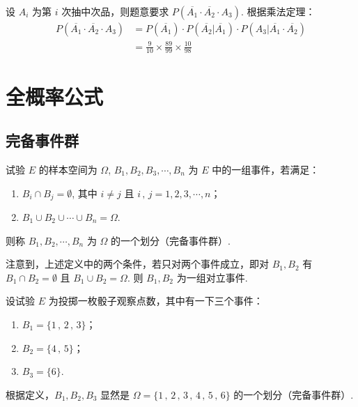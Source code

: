 \documentclass[12pt, a4paper, oneside, UTF8]{ctexbook}
\begin{document}
\begin{solution}
    设 \(A_i\) 为第 \(i\) 次抽中次品，则题意要求 \(P\left(\overline{A_1}\cdot \overline{A_2} \cdot A_3\right)\). 根据乘法定理：
    \begin{align*}
        P\left(\overline{A_1}\cdot \overline{A_2} \cdot A_3\right) &= P\left(\overline{A_1}\right) \cdot P\left(\overline{A_2} | \overline{A_1}\right) \cdot P\left(A_3 | \overline{A_1} \cdot \overline{A_2}\right) \\
        &= \frac{9}{10} \times \frac{89}{99} \times \frac{10}{98}
    \end{align*}
\end{solution}

\clearpage

\section{全概率公式}

\subsection{完备事件群}

\begin{defn}
    试验 \(E\) 的样本空间为 \(\Omega\), \(B_1 , B_2 , B_3 , \cdots , B_n\) 为 \(E\) 中的一组事件，若满足：
    \begin{enumerate}
        \item \(B_i \cap B_j = \emptyset\), 其中 \(i \neq j\) 且 \(i\,,\,j = 1 , 2 , 3 ,\cdots , n\)；
        \item \(B_1 \cup B_2 \cup \cdots \cup B_n = \Omega\).
    \end{enumerate}
    则称 \(B_1 , B_2 , \cdots , B_n\) 为 \(\Omega\) 的一个划分（完备事件群）.
\end{defn}

\begin{rmk}
    注意到，上述定义中的两个条件，若只对两个事件成立，即对 \(B_1 , B_2\) 有 \(B_1 \cap B_2 = \emptyset\) 且 \(B_1 \cup B_2 = \Omega\). 则 \(B_1 , B_2\) 为一组对立事件.
\end{rmk}

\begin{example}
    设试验 \(E\) 为投掷一枚骰子观察点数，其中有一下三个事件：
    \begin{enumerate}
        \item[] \(B_1 = \{1\,,\,2\,,\,3\}\)；
        \item[] \(B_2 = \{4\,,\,5\}\)；
        \item[] \(B_3 = \{6\}\).
    \end{enumerate}
    根据定义，\(B_1 , B_2 , B_3\) 显然是 \(\Omega = \{1\,,\,2\,,\,3\,,\,4\,,\,5\,,\,6\}\) 的一个划分（完备事件群）.
\end{example}
\end{document}
